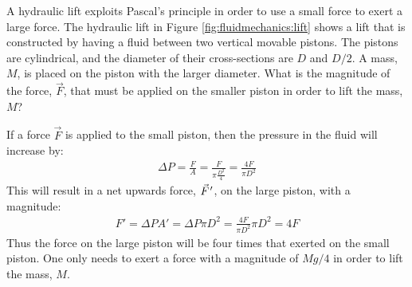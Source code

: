 \begin{example}{
A hydraulic lift exploits Pascal's principle in order to use a small force to exert a large force. The hydraulic lift in Figure \ref{fig:fluidmechanics:lift} shows a lift that is constructed by having a fluid between two vertical movable pistons. The pistons are cylindrical, and the diameter of their cross-sections are $D$ and $D/2$. A mass, $M$, is placed on the piston with the larger diameter. What is the magnitude of the force, $\vec F$, that must be applied on the smaller piston in order to lift the mass, $M$?}

If a force $\vec F$ is applied to the small piston, then the pressure in the fluid will increase by:
\begin{align*}
\Delta P = \frac{F}{A}=\frac{F}{\pi \frac{D^2}{4}}=\frac{4F}{\pi D^2}
\end{align*}
This will result in a net upwards force, $\pvec F'$, on the large piston, with a magnitude:
\begin{align*}
F' = \Delta P A' = \Delta P \pi D^2 = \frac{4F}{\pi D^2} \pi D^2 = 4F
\end{align*}
Thus the force on the large piston will be four times that exerted on the small piston. One only needs to exert a force with a magnitude of $Mg/4$ in order to lift the mass, $M$.
\end{example}

